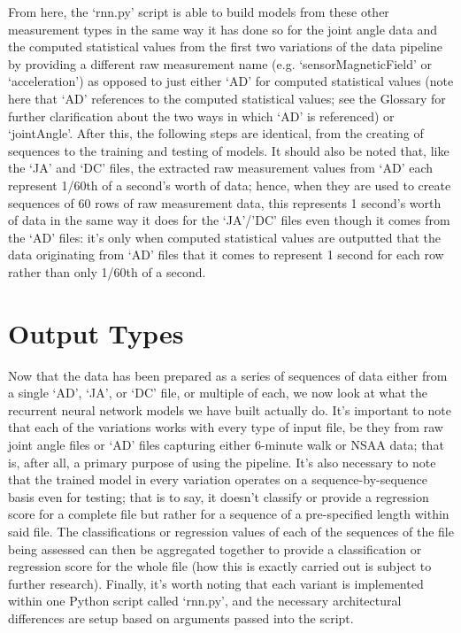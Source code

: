 \documentclass[12pt,twoside]{report}
\begin{document}
\quad From here, the ‘rnn.py’ script is able to build models from these other measurement types in the same way it has done so for the joint angle data and the computed statistical values from the first two variations of the data pipeline by providing a different raw measurement name (e.g. ‘sensorMagneticField’ or ‘acceleration’) as opposed to just either ‘AD’ for computed statistical values (note here that ‘AD’ references to the computed statistical values; see the Glossary for further clarification about the two ways in which ‘AD’ is referenced) or ‘jointAngle’. After this, the following steps are identical, from the creating of sequences to the training and testing of models. It should also be noted that, like the ‘JA’ and ‘DC’ files, the extracted raw measurement values from ‘AD’ each represent 1/60th of a second’s worth of data; hence, when they are used to create sequences of 60 rows of raw measurement data, this represents 1 second’s worth of data in the same way it does for the ‘JA’/’DC’ files even though it comes from the ‘AD’ files: it’s only when computed statistical values are outputted that the data originating from ‘AD’ files that it comes to represent 1 second for each row rather than only 1/60th of a second.



\section{Output Types}

\quad Now that the data has been prepared as a series of sequences of data either from a single ‘AD’, ‘JA’, or ‘DC’ file, or multiple of each, we now look at what the recurrent neural network models we have built actually do. It’s important to note that each of the variations works with every type of input file, be they from raw joint angle files or ‘AD’ files capturing either 6-minute walk or NSAA data; that is, after all, a primary purpose of using the pipeline. It’s also necessary to note that the trained model in every variation operates on a sequence-by-sequence basis even for testing; that is to say, it doesn’t classify or provide a regression score for a complete file but rather for a sequence of a pre-specified length within said file. The classifications or regression values of each of the sequences of the file being assessed can then be aggregated together to provide a classification or regression score for the whole file (how this is exactly carried out is subject to further research). Finally, it’s worth noting that each variant is implemented within one Python script called ‘rnn.py’, and the necessary architectural differences are setup based on arguments passed into the script.\\
\end{document}
